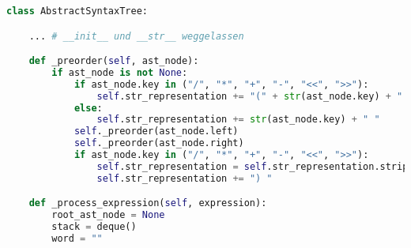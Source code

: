 \begin{lstlisting}[language=Python, caption=Klasse \textit{AbstractSyntaxTree}]
class AbstractSyntaxTree:

    ... # __init__ und __str__ weggelassen 

    def _preorder(self, ast_node):
        if ast_node is not None:
            if ast_node.key in ("/", "*", "+", "-", "<<", ">>"):
                self.str_representation += "(" + str(ast_node.key) + " "
            else:
                self.str_representation += str(ast_node.key) + " "
            self._preorder(ast_node.left)
            self._preorder(ast_node.right)
            if ast_node.key in ("/", "*", "+", "-", "<<", ">>"):
                self.str_representation = self.str_representation.strip()
                self.str_representation += ") "

    def _process_expression(self, expression):
        root_ast_node = None
        stack = deque()
        word = ""


\end{lstlisting}
